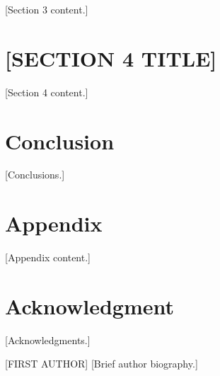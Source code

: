 \documentclass[journal]{IEEEtran}
\begin{document}
[Section 3 content.]


\section{[SECTION 4 TITLE]}
\label{sec:section4}

[Section 4 content.]


\section{Conclusion}
\label{sec:conclusion}

[Conclusions.]


\appendices
\section{Appendix}
[Appendix content.]


\section*{Acknowledgment}

[Acknowledgments.]






\begin{IEEEbiographynophoto}{[FIRST AUTHOR]}
[Brief author biography.]
\end{IEEEbiographynophoto}
\end{document}
